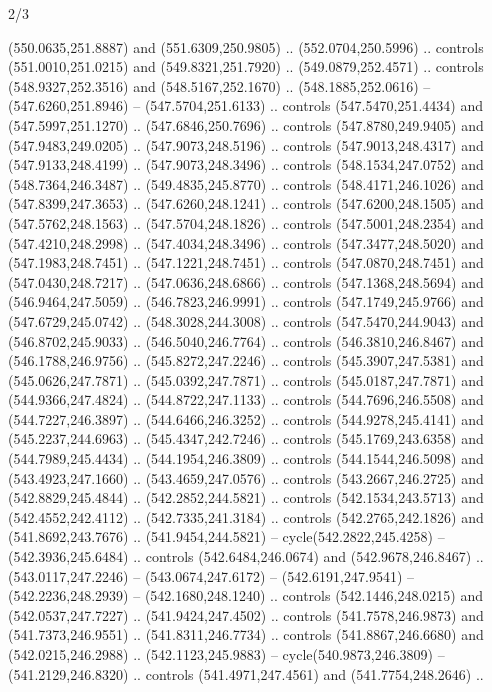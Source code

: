 \begin{flagdescription}{2/3}
\begin{scope}[xshift=0.5\flaglength,yshift=0.5\flagwidth,scale=\flagwidth/495.65]
\begin{scope}[y=0.8pt, x=0.8pt, yscale=-1,shift={(-463.76,-309.78)}]
  (550.0635,251.8887) and (551.6309,250.9805) .. (552.0704,250.5996) .. controls
  (551.0010,251.0215) and (549.8321,251.7920) .. (549.0879,252.4571) .. controls
  (548.9327,252.3516) and (548.5167,252.1670) .. (548.1885,252.0616) --
  (547.6260,251.8946) -- (547.5704,251.6133) .. controls (547.5470,251.4434) and
  (547.5997,251.1270) .. (547.6846,250.7696) .. controls (547.8780,249.9405) and
  (547.9483,249.0205) .. (547.9073,248.5196) .. controls (547.9013,248.4317) and
  (547.9133,248.4199) .. (547.9073,248.3496) .. controls (548.1534,247.0752) and
  (548.7364,246.3487) .. (549.4835,245.8770) .. controls (548.4171,246.1026) and
  (547.8399,247.3653) .. (547.6260,248.1241) .. controls (547.6200,248.1505) and
  (547.5762,248.1563) .. (547.5704,248.1826) .. controls (547.5001,248.2354) and
  (547.4210,248.2998) .. (547.4034,248.3496) .. controls (547.3477,248.5020) and
  (547.1983,248.7451) .. (547.1221,248.7451) .. controls (547.0870,248.7451) and
  (547.0430,248.7217) .. (547.0636,248.6866) .. controls (547.1368,248.5694) and
  (546.9464,247.5059) .. (546.7823,246.9991) .. controls (547.1749,245.9766) and
  (547.6729,245.0742) .. (548.3028,244.3008) .. controls (547.5470,244.9043) and
  (546.8702,245.9033) .. (546.5040,246.7764) .. controls (546.3810,246.8467) and
  (546.1788,246.9756) .. (545.8272,247.2246) .. controls (545.3907,247.5381) and
  (545.0626,247.7871) .. (545.0392,247.7871) .. controls (545.0187,247.7871) and
  (544.9366,247.4824) .. (544.8722,247.1133) .. controls (544.7696,246.5508) and
  (544.7227,246.3897) .. (544.6466,246.3252) .. controls (544.9278,245.4141) and
  (545.2237,244.6963) .. (545.4347,242.7246) .. controls (545.1769,243.6358) and
  (544.7989,245.4434) .. (544.1954,246.3809) .. controls (544.1544,246.5098) and
  (543.4923,247.1660) .. (543.4659,247.0576) .. controls (543.2667,246.2725) and
  (542.8829,245.4844) .. (542.2852,244.5821) .. controls (542.1534,243.5713) and
  (542.4552,242.4112) .. (542.7335,241.3184) .. controls (542.2765,242.1826) and
  (541.8692,243.7676) .. (541.9454,244.5821) -- cycle(542.2822,245.4258) --
  (542.3936,245.6484) .. controls (542.6484,246.0674) and (542.9678,246.8467) ..
  (543.0117,247.2246) -- (543.0674,247.6172) -- (542.6191,247.9541) --
  (542.2236,248.2939) -- (542.1680,248.1240) .. controls (542.1446,248.0215) and
  (542.0537,247.7227) .. (541.9424,247.4502) .. controls (541.7578,246.9873) and
  (541.7373,246.9551) .. (541.8311,246.7734) .. controls (541.8867,246.6680) and
  (542.0215,246.2988) .. (542.1123,245.9883) -- cycle(540.9873,246.3809) --
  (541.2129,246.8320) .. controls (541.4971,247.4561) and (541.7754,248.2646) ..

\end{scope}
\end{scope}
\end{flagdescription}
